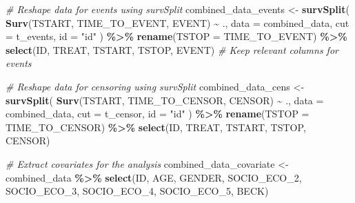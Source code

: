 \documentclass[
]{book}
\newenvironment{Shaded}{\begin{snugshade}}{\end{snugshade}}
\newcommand{\AttributeTok}[1]{\textcolor[rgb]{0.13,0.29,0.53}{#1}}
\newcommand{\CommentTok}[1]{\textcolor[rgb]{0.56,0.35,0.01}{\textit{#1}}}
\newcommand{\FunctionTok}[1]{\textcolor[rgb]{0.13,0.29,0.53}{\textbf{#1}}}
\newcommand{\NormalTok}[1]{#1}
\newcommand{\OtherTok}[1]{\textcolor[rgb]{0.56,0.35,0.01}{#1}}
\newcommand{\SpecialCharTok}[1]{\textcolor[rgb]{0.81,0.36,0.00}{\textbf{#1}}}
\newcommand{\StringTok}[1]{\textcolor[rgb]{0.31,0.60,0.02}{#1}}
\begin{document}
\begin{Shaded}
\begin{Highlighting}[]
\CommentTok{\# Reshape data for events using survSplit}
\NormalTok{combined\_data\_events }\OtherTok{\textless{}{-}} \FunctionTok{survSplit}\NormalTok{(}
  \FunctionTok{Surv}\NormalTok{(TSTART, TIME\_TO\_EVENT, EVENT) }\SpecialCharTok{\textasciitilde{}}\NormalTok{ ., }
  \AttributeTok{data =}\NormalTok{ combined\_data, }
  \AttributeTok{cut =}\NormalTok{ t\_events, }
  \AttributeTok{id =} \StringTok{"id"}
\NormalTok{) }\SpecialCharTok{\%\textgreater{}\%}
  \FunctionTok{rename}\NormalTok{(}\AttributeTok{TSTOP =}\NormalTok{ TIME\_TO\_EVENT) }\SpecialCharTok{\%\textgreater{}\%}
  \FunctionTok{select}\NormalTok{(ID, TREAT, TSTART, TSTOP, EVENT)    }\CommentTok{\# Keep relevant columns for events}

\CommentTok{\# Reshape data for censoring using survSplit}
\NormalTok{combined\_data\_cens }\OtherTok{\textless{}{-}} \FunctionTok{survSplit}\NormalTok{(}
  \FunctionTok{Surv}\NormalTok{(TSTART, TIME\_TO\_CENSOR, CENSOR) }\SpecialCharTok{\textasciitilde{}}\NormalTok{ ., }
  \AttributeTok{data =}\NormalTok{ combined\_data, }
  \AttributeTok{cut =}\NormalTok{ t\_censor, }
  \AttributeTok{id =} \StringTok{"id"}
\NormalTok{) }\SpecialCharTok{\%\textgreater{}\%}
  \FunctionTok{rename}\NormalTok{(}\AttributeTok{TSTOP =}\NormalTok{ TIME\_TO\_CENSOR) }\SpecialCharTok{\%\textgreater{}\%}
  \FunctionTok{select}\NormalTok{(ID, TREAT, TSTART, TSTOP, CENSOR)  }

\CommentTok{\# Extract covariates for the analysis}
\NormalTok{combined\_data\_covariate }\OtherTok{\textless{}{-}}\NormalTok{ combined\_data }\SpecialCharTok{\%\textgreater{}\%}
  \FunctionTok{select}\NormalTok{(ID, AGE, GENDER, SOCIO\_ECO\_2, SOCIO\_ECO\_3, SOCIO\_ECO\_4, SOCIO\_ECO\_5, BECK)}


\end{Highlighting}
\end{Shaded}
\end{document}
